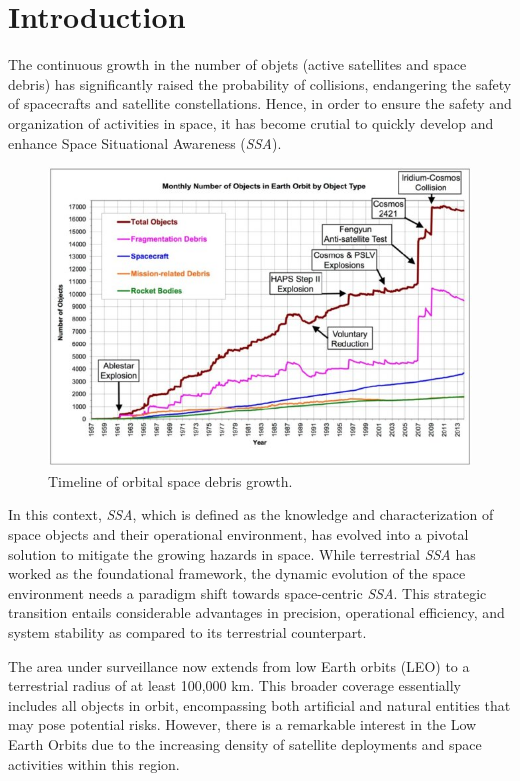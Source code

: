\section{Introduction}
The continuous growth in the number of objets (active satellites and space debris) has significantly raised the probability of collisions, endangering the safety of spacecrafts and satellite constellations. Hence, in order to ensure the safety and organization of activities in space, it has become crutial to quickly develop and enhance Space Situational Awareness (\textit{SSA}).


\begin{figure}[ht]
    \centering
    \includegraphics[width=0.8\columnwidth]{Figures/Growth-of-orbital-space-object-including-space-debris-NASA-Orbital-Debris-program_W640.jpg}
    \caption{Timeline of orbital space debris growth.}
    \label{fig:orbital_debris_growth}
\end{figure}

In this context, \textit{SSA}, which is defined as the knowledge and characterization of space objects and their operational environment, has evolved into a pivotal solution  to mitigate the growing hazards in space. While terrestrial \textit{SSA} has worked as the foundational framework, the dynamic evolution of the space environment needs a paradigm shift towards space-centric \textit{SSA}. This strategic transition entails considerable advantages in precision, operational efficiency, and system stability as compared to its terrestrial counterpart.


The area under surveillance now extends from low Earth orbits (LEO) to a terrestrial radius of at least 100,000 km. This broader coverage essentially includes all objects in orbit, encompassing both artificial and natural entities that may pose potential risks. However, there is a remarkable interest in the Low Earth Orbits due to the increasing density of satellite deployments and space activities within this region.

